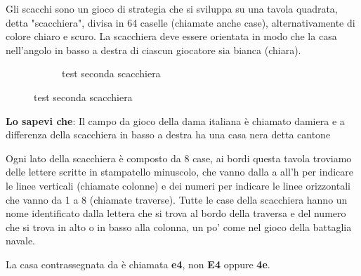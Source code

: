 	Gli scacchi sono un gioco di strategia che si sviluppa su una tavola quadrata, detta "scacchiera", divisa in 64 caselle (chiamate anche case), alternativamente di colore chiaro e scuro. La scacchiera deve essere orientata in modo che la casa nell'angolo in basso a destra di ciascun giocatore sia bianca (chiara).

\begin{figure}
	\centering
	\begin{subfigure}{.5\textwidth}
		\centering
		\chessboard[showmover=false, 
		labeltoplift=2mm, %
		label=true
		]            
		\caption{test seconda scacchiera}
	\end{subfigure}%
\end{figure}

\begin{quotebox}
	\textbf{Lo sapevi che}: Il campo da gioco della dama italiana è chiamato damiera e a differenza della scacchiera in basso a destra ha una casa nera detta cantone
\end{quotebox}

Ogni lato della scacchiera è composto da 8 case, ai bordi questa tavola troviamo delle lettere scritte in stampatello minuscolo, che vanno dalla a all’h per indicare le linee verticali (chiamate colonne) e dei numeri per indicare le linee orizzontali che vanno da 1 a 8 (chiamate traverse).
Tutte le case della scacchiera hanno un nome identificato dalla lettera che si trova al bordo della traversa e del numero che si trova in alto o in basso alla colonna, un po’ come nel gioco della battaglia navale.

La casa contrassegnata da \circledmark{*} è chiamata \textbf{e4}, non \textbf{E4} oppure \textbf{4e}.
